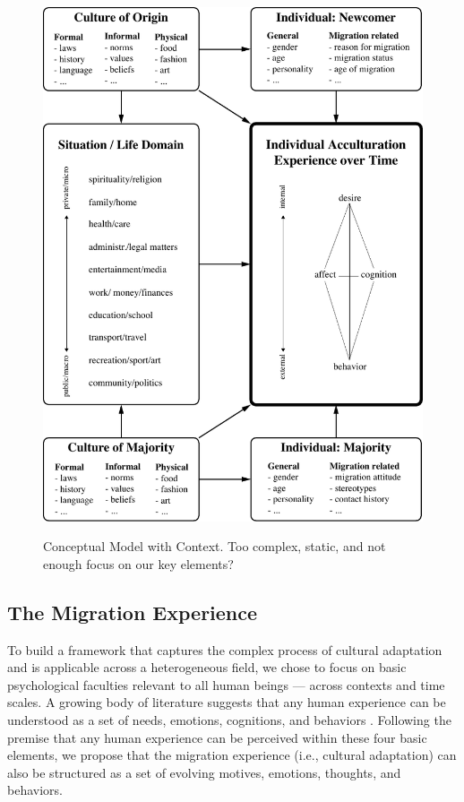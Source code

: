 \documentclass[man, 12pt, a4paper]{apa7}
\begin{document}
\begin{figure}[h]
\centering
\caption{Conceptual Model with Context. Too complex, static, and not enough focus on our key elements?}
\includegraphics[width=\textwidth]{Figures/ConceptualFrameworkStatic.pdf}
\label{fig:ModelContext}
\end{figure}

\subsection{The Migration Experience}
To build a framework that captures the complex process of cultural adaptation and is applicable across a heterogeneous field, we chose to focus on basic psychological faculties relevant to all human beings --- across contexts and time scales. A growing body of literature suggests that any human experience can be understood as a set of needs, emotions, cognitions, and behaviors \citep[sometimes referred to as the ABCs or ABCDs of psychology: affect, behavior, cognition, desire; e.g.,][]{Cottam2010, Hogg2005, Jhangiani2014}. Following the premise that any human experience can be perceived within these four basic elements, we propose that the migration experience (i.e., cultural adaptation) can also be structured as a set of evolving motives, emotions, thoughts, and behaviors. 
\end{document}
